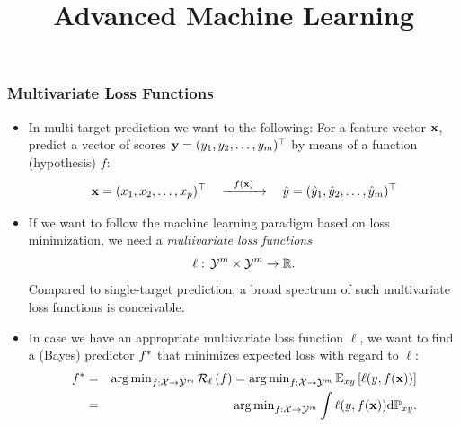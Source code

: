 \documentclass[11pt,compress,t,notes=noshow, xcolor=table]{beamer}
\title{Advanced Machine Learning}
\date{}
\begin{document}



\sloppy


\begin{frame}
	\frametitle{Multivariate Loss Functions}
	\begin{itemize}
%		
		\small
%		
		\item In multi-target prediction we want to the following: For a feature vector $\mathbf{x}$, predict a vector of scores $\mathbf{y} = (y_1, y_2, \ldots, y_m)^\top$ by means of a function (hypothesis) $f$:
		$$
		\mathbf{x} = (x_1,x_2,\ldots,x_p)^\top \quad \xrightarrow{~~f(\mathbf{x})~~} \quad \hat{y} = ( \hat{y}_1, \hat{y}_2, \ldots, \hat{y}_m)^\top
		$$
%		
		\item If we want to follow the machine learning paradigm based on loss minimization, we need a \emph{multivariate loss functions} 
		$$
		\ell: \, \mathcal{Y}^m \times \mathcal{Y}^m \rightarrow \mathbb{R}.
		$$  
		Compared to single-target prediction,  a broad spectrum of such multivariate loss functions	is conceivable. 
%		
		\item In case we have an appropriate multivariate loss function $\ell$, we want to find a (Bayes) predictor $f^{\ast}$ that minimizes expected loss with regard to $\ell:$
%		
		\begin{eqnarray*}
			f^{\ast} &=& \operatorname{arg\,min}_{f: \mathcal{X} \to \mathcal{Y}^m} \mathcal{R}_\ell \left(f\right) = \operatorname{arg\,min}_{f: \mathcal{X} \to \mathcal{Y}^m}\mathbb{E}_{xy}\left[ \ell(y,f(\mathbf{x})) \right]\\ &=&  \operatorname{arg\,min}_{f: \mathcal{X} \to \mathcal{Y}^m }\int \ell(y,f(\mathbf{x})) \text{d}\mathbb{P}_{xy}. 
		\end{eqnarray*}
%				
%		
%
	\end{itemize}
	
\end{frame}
\end{document}
